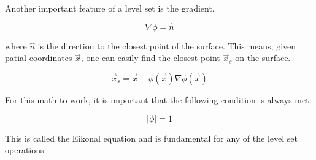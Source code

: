 Another important feature of a level set is the gradient.

\begin{equation}
\nabla \phi = \hat{n}
\end{equation}

where $\hat{n}$ is the direction to the closest point of the surface. This means, given patial coordinates $\vec{x}$, one can easily find the closest point $\vec{x}_s$ on the surface. 

\begin{equation}
\vec{x}_s = \vec{x} - \phi(\vec{x})\nabla \phi(\vec{x})
\end{equation}

For this math to work, it is important that the following condition is always met:

\begin{equation}
|\phi| = 1
\end{equation}

This is called the Eikonal equation and is fundamental for any of the level set operations. 
